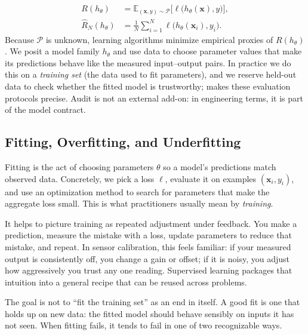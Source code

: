 \begin{equation}
\begin{aligned}
    R(h_\theta) &= \mathbb{E}_{(\mathbf{x}, y)\sim \mathcal P}\big[\ell\big(h_\theta(\mathbf{x}), y\big)\big],\\
    \hat R_N(h_\theta) &= \frac{1}{N} \sum_{i=1}^N \ell\big(h_\theta(\mathbf{x}_i), y_i\big).
\end{aligned}
\label{eq:population_and_empirical_risk}
\end{equation}
Because \(\mathcal P\) is unknown, learning algorithms minimize empirical proxies of \(R(h_\theta)\). We posit a model family \(h_\theta\) and use data to choose parameter values that make its predictions behave like the measured input--output pairs. In practice we do this on a \emph{training set} (the data used to fit parameters), and we reserve held-out data to check whether the fitted model is trustworthy;  makes these evaluation protocols precise. Audit is not an external add-on: in engineering terms, it is part of the model contract.

\subsection{Fitting, Overfitting, and Underfitting}
\label{sec:supervised_fitting_overfitting_and_underfitting}

Fitting is the act of choosing parameters \(\theta\) so a model's predictions match observed data. Concretely, we pick a loss \(\ell\), evaluate it on examples \((\mathbf{x}_i, y_i)\), and use an optimization method to search for parameters that make the aggregate loss small. This is what practitioners usually mean by \emph{training}.

It helps to picture training as repeated adjustment under feedback. You make a prediction, measure the mistake with a loss, update parameters to reduce that mistake, and repeat. In sensor calibration, this feels familiar: if your measured output is consistently off, you change a gain or offset; if it is noisy, you adjust how aggressively you trust any one reading. Supervised learning packages that intuition into a general recipe that can be reused across problems.

The goal is not to ``fit the training set'' as an end in itself. A good fit is one that holds up on new data: the fitted model should behave sensibly on inputs it has not seen. When fitting fails, it tends to fail in one of two recognizable ways.

